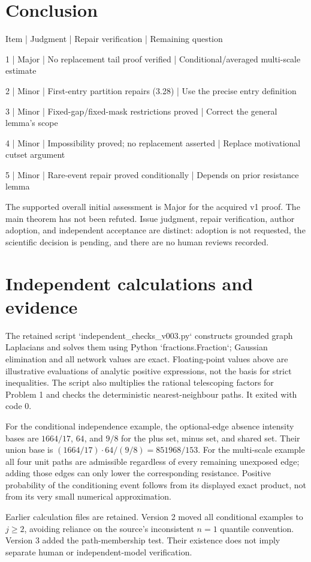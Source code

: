 \documentclass[10pt]{article}
\begin{document}
\section*{Conclusion}
Item | Judgment | Repair verification | Remaining question\par
1 | Major | No replacement tail proof verified | Conditional/averaged multi-scale estimate\par
2 | Minor | First-entry partition repairs (3.28) | Use the precise entry definition\par
3 | Minor | Fixed-gap/fixed-mask restrictions proved | Correct the general lemma’s scope\par
4 | Minor | Impossibility proved; no replacement asserted | Replace motivational cutset argument\par
5 | Minor | Rare-event repair proved conditionally | Depends on prior resistance lemma\par
The supported overall initial assessment is Major for the acquired v1 proof. The main theorem has not been refuted. Issue judgment, repair verification, author adoption, and independent acceptance are distinct: adoption is not requested, the scientific decision is pending, and there are no human reviews recorded.\par
\section*{Independent calculations and evidence}
The retained script `independent\_checks\_v003.py` constructs grounded graph Laplacians and solves them using Python `fractions.Fraction`; Gaussian elimination and all network values are exact. Floating-point values above are illustrative evaluations of analytic positive expressions, not the basis for strict inequalities. The script also multiplies the rational telescoping factors for Problem 1 and checks the deterministic nearest-neighbour paths. It exited with code 0.\par
For the conditional independence example, the optional-edge absence intensity bases are \(1664/17\), \(64\), and \(9/8\) for the plus set, minus set, and shared set. Their union base is \((1664/17)\cdot64/(9/8)=851968/153\). For the multi-scale example all four unit paths are admissible regardless of every remaining unexposed edge; adding those edges can only lower the corresponding resistance. Positive probability of the conditioning event follows from its displayed exact product, not from its very small numerical approximation.\par
Earlier calculation files are retained. Version 2 moved all conditional examples to \(j\ge2\), avoiding reliance on the source’s inconsistent \(n=1\) quantile convention. Version 3 added the path-membership test. Their existence does not imply separate human or independent-model verification.\par
\end{document}
